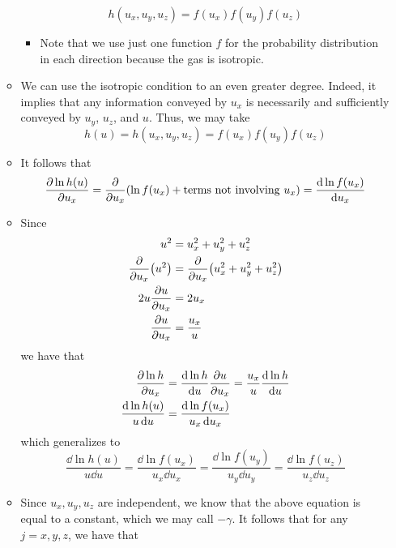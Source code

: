 \documentclass[../notes.tex]{subfiles}
\begin{document}
\begin{itemize}
\begin{itemize}
        \begin{equation*}
            h(u_x,u_y,u_z) = f(u_x)f(u_y)f(u_z)
        \end{equation*}
        \begin{itemize}
            \item Note that we use just one function $f$ for the probability distribution in each direction because the gas is isotropic.
        \end{itemize}
        \item We can use the isotropic condition to an even greater degree. Indeed, it implies that any information conveyed by $u_x$ is necessarily and sufficiently conveyed by $u_y$, $u_z$, and $u$. Thus, we may take
        \begin{equation*}
            h(u) = h(u_x,u_y,u_z) = f(u_x)f(u_y)f(u_z)
        \end{equation*}
        \item It follows that
        \begin{equation*}
            \pdv{\ln h(u)}{u_x} = \pdv{u_x}(\ln f(u_x)+\text{terms not involving }u_x)
            = \dv{\ln f(u_x)}{u_x}
        \end{equation*}
        \item Since
        \begin{align*}
            u^2 &= u_x^2+u_y^2+u_z^2\\
            \pdv{u_x}(u^2) &= \pdv{u_x}(u_x^2+u_y^2+u_z^2)\\
            2u\pdv{u}{u_x} &= 2u_x\\
            \pdv{u}{u_x} &= \frac{u_x}{u}
        \end{align*}
        we have that
        \begin{align*}
            \pdv{\ln h}{u_x} &= \dv{\ln h}{u}\pdv{u}{u_x} = \frac{u_x}{u}\dv{\ln h}{u}\\
            \frac{\dd{\ln h(u)}}{u\dd{u}} &= \frac{\dd{\ln f(u_x)}}{u_x\dd{u_x}}
        \end{align*}
        which generalizes to
        \begin{equation*}
            \frac{\dd{\ln h(u)}}{u\dd{u}} = \frac{\dd{\ln f(u_x)}}{u_x\dd{u_x}}
            = \frac{\dd{\ln f(u_y)}}{u_y\dd{u_y}}
            = \frac{\dd{\ln f(u_z)}}{u_z\dd{u_z}}
        \end{equation*}
        \item Since $u_x,u_y,u_z$ are independent, we know that the above equation is equal to a constant, which we may call $-\gamma$. It follows that for any $j=x,y,z$, we have that

\end{itemize}
\end{itemize}
\end{document}

